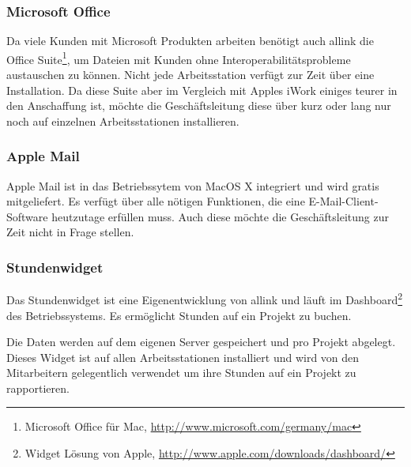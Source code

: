\subsubsection{Microsoft Office}
Da viele Kunden mit Microsoft Produkten arbeiten benötigt auch allink die
Office Suite\footnote{Microsoft Office für Mac, \url{http://www.microsoft.com/germany/mac}}, 
um Dateien mit Kunden ohne Interoperabilitätsprobleme austauschen zu können. 
Nicht jede Arbeitsstation verfügt zur Zeit über eine Installation. Da diese
Suite aber im Vergleich mit Apples iWork einiges teurer in den Anschaffung ist,
möchte die Geschäftsleitung diese über kurz oder lang nur noch auf einzelnen
Arbeitsstationen installieren.

\subsubsection{Apple Mail}
Apple Mail ist in das Betriebssytem von MacOS X integriert und wird gratis
mitgeliefert. Es verfügt über alle nötigen Funktionen, die eine E-Mail-Client-Software
heutzutage erfüllen muss. Auch diese möchte die Geschäftsleitung zur Zeit nicht
in Frage stellen.

\subsubsection{Stundenwidget}
Das Stundenwidget ist eine Eigenentwicklung von allink und läuft
im Dashboard\footnote{Widget Lösung von Apple, \url{http://www.apple.com/downloads/dashboard/}}
des Betriebssystems. Es ermöglicht Stunden auf ein Projekt zu buchen.
% 

Die Daten werden auf dem eigenen Server gespeichert und pro Projekt abgelegt. Dieses Widget ist auf allen
Arbeitsstationen installiert und wird von den Mitarbeitern gelegentlich verwendet
um ihre Stunden auf ein Projekt zu rapportieren.
